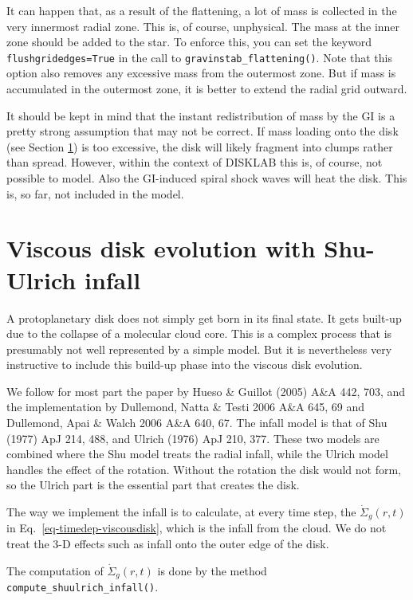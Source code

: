 \documentclass{book}
\newcommand{\code}[1]{{\small\tt #1}}
\begin{document}
It can happen that, as a result of the flattening, a lot of mass is collected in
the very innermost radial zone. This is, of course, unphysical. The mass at the
inner zone should be added to the star. To enforce this, you can set the keyword
\code{flushgridedges=True} in the call to \code{gravinstab\_flattening()}. Note
that this option also removes any excessive mass from the outermost zone. But if
mass is accumulated in the outermost zone, it is better to extend the radial
grid outward.

It should be kept in mind that the instant redistribution of mass by the GI is a
pretty strong assumption that may not be correct. If mass loading onto the disk
(see Section \ref{sec-time-dep-visc-disk-shu-ulrich}) is too excessive, the disk
will likely fragment into clumps rather than spread. However, within the context
of {\sf DISKLAB} this is, of course, not possible to model. Also the GI-induced
spiral shock waves will heat the disk. This is, so far, not included in the model.


\section{Viscous disk evolution with Shu-Ulrich infall}
\label{sec-time-dep-visc-disk-shu-ulrich}
%
A protoplanetary disk does not simply get born in its final state. It gets built-up
due to the collapse of a molecular cloud core. This is a complex process that is
presumably not well represented by a simple model. But it is nevertheless very
instructive to include this build-up phase into the viscous disk evolution.

We follow for most part the paper by Hueso \& Guillot (2005) A\&A 442, 703, and
the implementation by Dullemond, Natta \& Testi 2006 A\&A 645, 69 and Dullemond,
Apai \& Walch 2006 A\&A 640, 67. The infall model is that of Shu (1977) ApJ 214,
488, and Ulrich (1976) ApJ 210, 377. These two models are combined where the Shu
model treats the radial infall, while the Ulrich model handles the effect of the
rotation. Without the rotation the disk would not form, so the Ulrich part is
the essential part that creates the disk.

The way we implement the infall is to calculate, at every time step, the
$\dot\Sigma_g(r,t)$ in Eq.~\ref{eq-timedep-viscousdisk}, which is the infall
from the cloud. We do not treat the 3-D effects such as infall onto the outer
edge of the disk.

The computation of $\dot\Sigma_g(r,t)$ is done by the method
\code{compute\_shuulrich\_infall()}.
\end{document}
